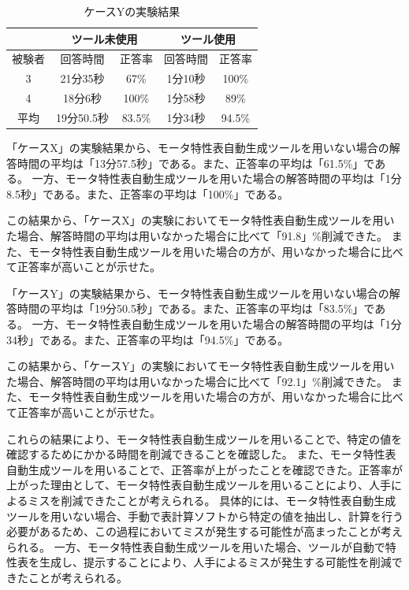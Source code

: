 \begin{table}[tp]
  \begin{center}
    \caption{ケースYの実験結果}
    \label{resultY}
    \begin{tabular}{c|c|c|c|c|}
    \cline{2-5}
                              & \multicolumn{2}{c|}{ツール未使用} & \multicolumn{2}{c|}{ツール使用} \\ \hline
    \multicolumn{1}{|c||}{被験者} & 回答時間           & 正答率          & 回答時間           & 正答率         \\ \hline\hline
    \multicolumn{1}{|c||}{3}   & 21分35秒           & 67\%         & 1分10秒           & 100\%         \\ \hline
    \multicolumn{1}{|c||}{4}   & 18分6秒          & 100\%          & 1分58秒          & 89\%         \\ \hline\hline
    \multicolumn{1}{|c||}{平均}   & 19分50.5秒          & 83.5\%          & 1分34秒          & 94.5\%         \\ \hline
    \end{tabular}
  \end{center}
\end{table}

「ケースX」の実験結果から、モータ特性表自動生成ツールを用いない場合の解答時間の平均は「13分57.5秒」である。また、正答率の平均は「61.5\%」である。
一方、モータ特性表自動生成ツールを用いた場合の解答時間の平均は「1分8.5秒」である。また、正答率の平均は「100\%」である。

この結果から、「ケースX」の実験においてモータ特性表自動生成ツールを用いた場合、解答時間の平均は用いなかった場合に比べて「91.8」\%削減できた。
また、モータ特性表自動生成ツールを用いた場合の方が、用いなかった場合に比べて正答率が高いことが示せた。

「ケースY」の実験結果から、モータ特性表自動生成ツールを用いない場合の解答時間の平均は「19分50.5秒」である。また、正答率の平均は「83.5\%」である。
一方、モータ特性表自動生成ツールを用いた場合の解答時間の平均は「1分34秒」である。また、正答率の平均は「94.5\%」である。

この結果から、「ケースY」の実験においてモータ特性表自動生成ツールを用いた場合、解答時間の平均は用いなかった場合に比べて「92.1」\%削減できた。
また、モータ特性表自動生成ツールを用いた場合の方が、用いなかった場合に比べて正答率が高いことが示せた。


これらの結果により、モータ特性表自動生成ツールを用いることで、特定の値を確認するためにかかる時間を削減できることを確認した。
また、モータ特性表自動生成ツールを用いることで、正答率が上がったことを確認できた。正答率が上がった理由として、モータ特性表自動生成ツールを用いることにより、人手によるミスを削減できたことが考えられる。
具体的には、モータ特性表自動生成ツールを用いない場合、手動で表計算ソフトから特定の値を抽出し、計算を行う必要があるため、この過程においてミスが発生する可能性が高まったことが考えられる。
一方、モータ特性表自動生成ツールを用いた場合、ツールが自動で特性表を生成し、提示することにより、人手によるミスが発生する可能性を削減できたことが考えられる。

